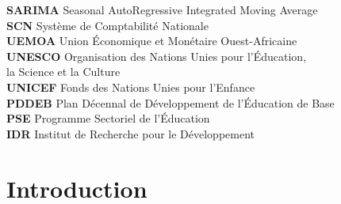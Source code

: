 \documentclass[
12pt,          %
a4paper,       %
oneside,       %
openright      %
]{report}
\begin{document}
\begin{tabbing}
		\textbf{SARIMA}   \> Seasonal AutoRegressive Integrated Moving Average \\[3pt]
		\textbf{SCN}      \> Système de Comptabilité Nationale \\[3pt]
		\textbf{UEMOA}    \> Union Économique et Monétaire Ouest-Africaine \\[3pt]
		\textbf{UNESCO}   \> Organisation des Nations Unies pour l'Éducation, \\[3pt]
		\> la Science et la Culture \\[3pt]
		\textbf{UNICEF}   \> Fonds des Nations Unies pour l'Enfance \\[3pt]
		\textbf{PDDEB}   \> Plan Décennal de Développement de l’Éducation de Base \\[3pt]
		\textbf{PSE}   \> Programme Sectoriel de l’Éducation \\[3pt]
		\textbf{IDR}   \> Institut de Recherche pour le Développement \\[3pt]
		
	\end{tabbing}
	
	\newpage
	
	
	
	\listoffigures
	\newpage
	
	\listoftables
	\newpage
	
	
	
	
	\chapter*{Introduction}
	
\end{document}

